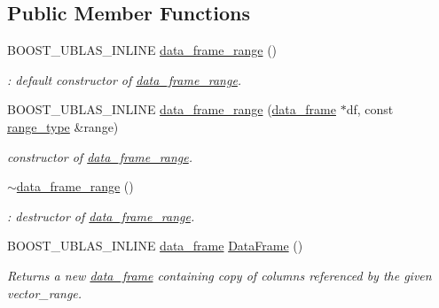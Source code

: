 \subsection*{Public Member Functions}
\begin{DoxyCompactItemize}
\item 
B\+O\+O\+S\+T\+\_\+\+U\+B\+L\+A\+S\+\_\+\+I\+N\+L\+I\+NE \hyperlink{classboost_1_1numeric_1_1ublas_1_1data__frame__range_a0d44306200160de0658458b18d445c56}{data\+\_\+frame\+\_\+range} ()
\begin{DoxyCompactList}\small\item\em \+: default constructor of \hyperlink{classboost_1_1numeric_1_1ublas_1_1data__frame__range}{data\+\_\+frame\+\_\+range}. \end{DoxyCompactList}\item 
B\+O\+O\+S\+T\+\_\+\+U\+B\+L\+A\+S\+\_\+\+I\+N\+L\+I\+NE \hyperlink{classboost_1_1numeric_1_1ublas_1_1data__frame__range_a4193ec3f79d994246ea04d24c0fd04f4}{data\+\_\+frame\+\_\+range} (\hyperlink{classboost_1_1numeric_1_1ublas_1_1data__frame}{data\+\_\+frame} $\ast$df, const \hyperlink{classboost_1_1numeric_1_1ublas_1_1data__frame__range_ac63cd34d67e118765217538d59076bf3}{range\+\_\+type} \&range)
\begin{DoxyCompactList}\small\item\em constructor of \hyperlink{classboost_1_1numeric_1_1ublas_1_1data__frame__range}{data\+\_\+frame\+\_\+range}. \end{DoxyCompactList}\item 
\hyperlink{classboost_1_1numeric_1_1ublas_1_1data__frame__range_afe0364a91817c2b6a3061bb8fd91cdb0}{$\sim$data\+\_\+frame\+\_\+range} ()
\begin{DoxyCompactList}\small\item\em \+: destructor of \hyperlink{classboost_1_1numeric_1_1ublas_1_1data__frame__range}{data\+\_\+frame\+\_\+range}. \end{DoxyCompactList}\item 
B\+O\+O\+S\+T\+\_\+\+U\+B\+L\+A\+S\+\_\+\+I\+N\+L\+I\+NE \hyperlink{classboost_1_1numeric_1_1ublas_1_1data__frame}{data\+\_\+frame} \hyperlink{classboost_1_1numeric_1_1ublas_1_1data__frame__range_a8ff3d84317f7cfece38037188d0ff998}{Data\+Frame} ()
\begin{DoxyCompactList}\small\item\em Returns a new \hyperlink{classboost_1_1numeric_1_1ublas_1_1data__frame}{data\+\_\+frame} containing copy of columns referenced by the given vector\+\_\+range. \end{DoxyCompactList}\item 

\end{DoxyCompactItemize}
